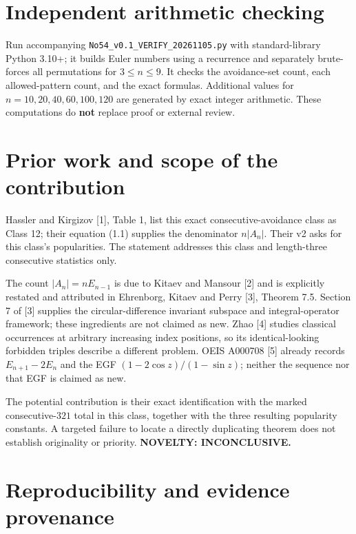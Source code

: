 \documentclass[
  11pt,
]{article}
\let\oldsection\section
\renewcommand{\section}{\needspace{5\baselineskip}\oldsection}
\begin{document}
\section{Independent arithmetic
checking}\label{independent-arithmetic-checking}

Run accompanying \texttt{No54\_v0.1\_VERIFY\_20261105.py} with
standard-library Python 3.10+; it builds Euler numbers using a
recurrence and separately brute-forces all permutations for
\(3\leq n\leq9\). It checks the avoidance-set count, each
allowed-pattern count, and the exact formulas. Additional values for
\(n=10,20,40,60,100,120\) are generated by exact integer arithmetic.
These computations do \textbf{not} replace proof or external review.

\section{Prior work and scope of the
contribution}\label{prior-work-and-scope-of-the-contribution}

Hassler and Kirgizov {[}1{]}, Table 1, list this exact
consecutive-avoidance class as Class 12; their equation (1.1) supplies
the denominator \(n|A_n|\). Their v2 asks for this class's popularities.
The statement addresses this class and length-three consecutive
statistics only.

The count \(|A_n|=nE_{n-1}\) is due to Kitaev and Mansour {[}2{]} and is
explicitly restated and attributed in Ehrenborg, Kitaev and Perry
{[}3{]}, Theorem 7.5. Section 7 of {[}3{]} supplies the
circular-difference invariant subspace and integral-operator framework;
these ingredients are not claimed as new. Zhao {[}4{]} studies classical
occurrences at arbitrary increasing index positions, so its
identical-looking forbidden triples describe a different problem. OEIS
A000708 {[}5{]} already records \(E_{n+1}-2E_n\) and the EGF
\((1-2\cos z)/(1-\sin z)\); neither the sequence nor that EGF is claimed
as new.

The potential contribution is their exact identification with the marked
consecutive-\(321\) total in this class, together with the three
resulting popularity constants. A targeted failure to locate a directly
duplicating theorem does not establish originality or priority.
\textbf{NOVELTY: INCONCLUSIVE.}

\section{Reproducibility and evidence
provenance}\label{reproducibility-and-evidence-provenance}
\end{document}
